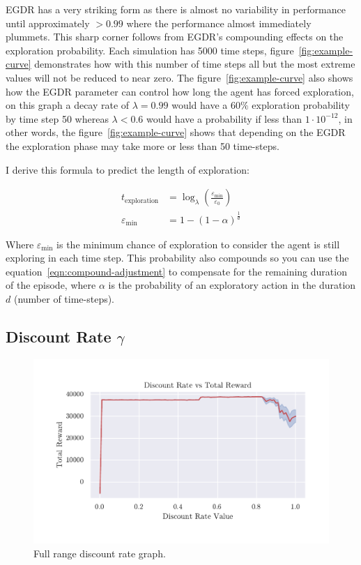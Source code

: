 \documentclass[]{final_report}
\begin{document}
EGDR has a very striking form as there is almost no variability in performance until approximately $>0.99$ where the performance almost immediately plummets. This sharp corner follows from EGDR's compounding effects on the exploration probability. Each simulation has 5000 time steps, figure~\ref{fig:example-curve} demonstrates how with this number of time steps all but the most extreme values will not be reduced to near zero. The figure~\ref{fig:example-curve} also shows how the EGDR parameter can control how long the agent has forced exploration, on this graph a decay rate of $\lambda = 0.99$ would have a $60\%$ exploration probability by time step 50 whereas $\lambda < 0.6$ would have a probability if less than $1 \cdot 10^{-12}$, in other words, the figure~\ref{fig:example-curve} shows that depending on the EGDR the exploration phase may take more or less than 50 time-steps. 


I derive this formula to predict the length of exploration:

\begin{align}
  t_{\text{exploration}} &= \log_{\lambda}(\frac{\varepsilon_{\text{min}}}{\varepsilon_0}) \\
  \varepsilon_{\text{min}} &= 1 - (1-\alpha)^{\frac{1}{d}} \label{eqn:compound-adjustment} 
\end{align}

Where $\varepsilon_{\text{min}}$ is the minimum chance of exploration to consider the agent is still exploring in each time step. This probability also compounds so you can use the equation~\ref{eqn:compound-adjustment} to compensate for the remaining duration of the episode, where $\alpha$ is the probability of an exploratory action in the duration $d$ (number of time-steps). 



\subsection{Discount Rate \texorpdfstring{$\gamma$}{Lg}}

\begin{figure}[H]
  \centering
  
  \includegraphics[trim={0 1cm 0 1cm},clip,width=\textwidth]{hyper-paramiters/discount-rate-full}
  
  \caption{\label{fig:discount-rate-full}Full range discount rate graph.}
\end{figure}
\end{document}
